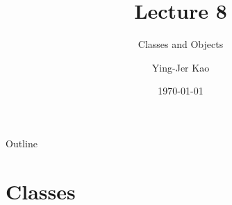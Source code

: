 \documentclass[handout]{beamer}
\title[Classes and Objects: Data Encapsulation and Methods] %
{Lecture 8}
\subtitle
{Classes and Objects} %
\author[Ying-Jer Kao] %
{Ying-Jer Kao}
\institute[National Taiwan University] %
{
  Department of Physics\\
 National Taiwan University
  }
\date[Numerical Analysis and Programming] %
{\today}
\begin{document}
\begin{frame}
  \titlepage
\end{frame}

\begin{frame}{Outline}
  \tableofcontents
\end{frame}




\section[Classes]{Classes}
\end{document}
